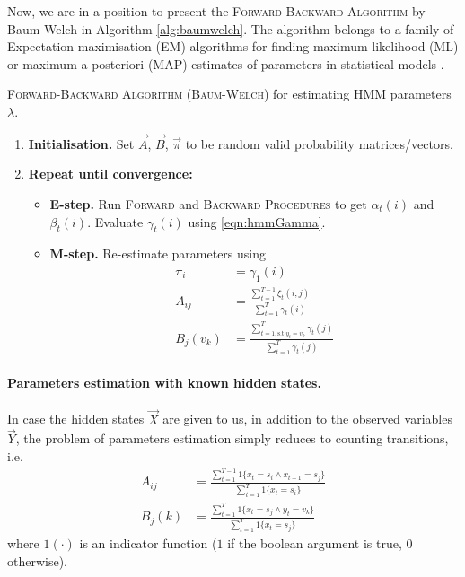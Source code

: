 	Now, we are in a position to present the \textsc{Forward-Backward Algorithm} by Baum-Welch in Algorithm \ref{alg:baumwelch}. The algorithm belongs to a family of Expectation-maximisation (EM) algorithms for finding maximum likelihood (ML) or maximum a posteriori (MAP) estimates of parameters in statistical models \cite{wiki:EM}.
	\begin{algorithm}
		\caption{\textsc{Forward-Backward Algorithm (Baum-Welch)} for estimating HMM parameters $\lambda$.}
		\label{alg:baumwelch}
		\begin{enumerate}
			\item
				\textbf{Initialisation.}
				Set $\vec A$, $\vec B$, $\vec \pi$ to be random valid probability matrices/vectors.
			\item
				\textbf{Repeat until convergence:}
				\begin{itemize}
					\item \textbf{E-step.} Run \textsc{Forward} and \textsc{Backward Procedures} to get $\alpha_t(i)$ and $\beta_t(i)$. Evaluate $\gamma_t(i)$ using \eqref{eqn:hmmGamma}.
					\item \textbf{M-step.} Re-estimate parameters using
					\begin{align*}
						\pi_i & = \gamma_1(i) \\
						A_{ij} & = \frac{\sum_{t = 1}^{T - 1} \xi_t(i, j)}{\sum_{t = 1}^T \gamma_t(i)} \\
						B_j(v_k) & = \frac{\sum_{t = 1, \text{s.t.} y_t = v_k}^T \gamma_t(j)}{\sum_{t = 1}^T \gamma_t(j)}
					\end{align*}
				\end{itemize}
		\end{enumerate}
	\end{algorithm}

	\paragraph{Parameters estimation with known hidden states.}
	In case the hidden states $\vec X$ are given to us, in addition to the observed variables $\vec Y$, the problem of parameters estimation simply reduces to counting transitions, i.e.
	\begin{align}
		A_{ij} & = \frac{\sum_{t = 1}^{T - 1} 1\{x_t = s_i \land x_{t + 1} = s_j\}}{\sum_{t = 1}^{T} 1\{x_t = s_i\}} \\
		B_j(k) & = \frac{\sum_{t = 1}^T 1\{x_t = s_j \land y_t = v_k\}}{\sum_{t = 1}^{T} 1\{x_t = s_j\}}
	\end{align}
	where $1(\cdot)$ is an indicator function ($1$ if the boolean argument is true, $0$ otherwise).

